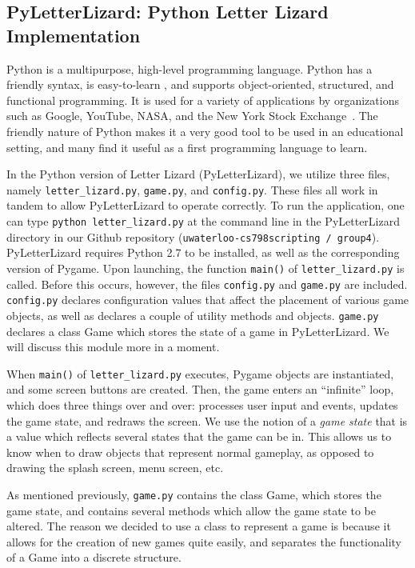 
\subsection{PyLetterLizard: Python Letter Lizard Implementation}

Python is a multipurpose, high-level programming language. Python has a friendly syntax, is easy-to-learn \cite{about_python}, and supports object-oriented, structured, and functional programming. It is used for a variety of applications by organizations such as Google, YouTube, NASA, and the New York Stock Exchange~\cite{whatis_python}. The friendly nature of Python makes it a very good tool to be used in an educational setting, and many find it useful as a first programming language to learn.
		
	In the Python version of Letter Lizard (PyLetterLizard), we utilize three files, namely \texttt{letter\_lizard.py}, \texttt{game.py}, and \texttt{config.py}. These files all work in tandem to allow PyLetterLizard to operate correctly. To run the application, one can type \texttt{python letter\_lizard.py} at the command line in the PyLetterLizard directory in our Github repository (\texttt{uwaterloo-cs798scripting / group4}). PyLetterLizard requires Python 2.7 to be installed, as well as the corresponding version of Pygame.  Upon launching, the function \texttt{main()} of \texttt{letter\_lizard.py} is called. Before this occurs, however, the files \texttt{config.py} and \texttt{game.py} are included. \texttt{config.py} declares configuration values that affect the placement of various game objects, as well as declares a couple of utility methods and objects. \texttt{game.py} declares a class Game which stores the state of a game in PyLetterLizard. We will discuss this module more in a moment.
	
	When \texttt{main()} of \texttt{letter\_lizard.py} executes, Pygame objects are instantiated, and some screen buttons are created. Then, the game enters an ``infinite'' loop, which does three things over and over: processes user input and events, updates the game state, and redraws the screen. We use the notion of a \emph{game state} that is a value which reflects several states that the game can be in. This allows us to know when to draw objects that represent normal gameplay, as opposed to drawing the splash screen, menu screen, etc.
	
	As mentioned previously, \texttt{game.py} contains the class Game, which stores the game state, and contains several methods which allow the game state to be altered. The reason we decided to use a class to represent a game is because it allows for the creation of new games quite easily, and separates the functionality of a Game into a discrete structure.
	
